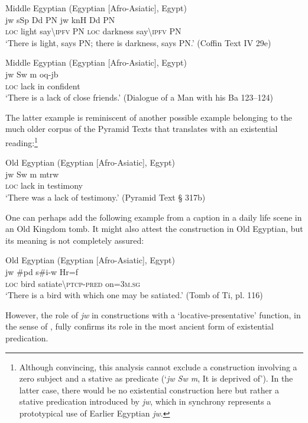 \documentclass[output=paper]{langsci/langscibook}
\begin{document}
\ea Middle Egyptian (Egyptian [Afro-Asiatic], Egypt) \label{ex:AE14}\\
	\gll jw 	sSp Dd PN jw knH Dd PN\\
	\textsc{loc} light say\textbackslash\textsc{ipfv} PN \textsc{loc} darkness say\textbackslash\textsc{ipfv} PN\\
	\glt ‘There is light, says PN; there is darkness, says PN.’ (Coffin Text IV 29e)
\z 

\ea Middle Egyptian (Egyptian [Afro-Asiatic], Egypt) \label{ex:AE15}\\
	\gll jw Sw m oq-jb\\
	\textsc{loc} lack in confident\\
	\glt ‘There is a lack of close friends.’ (Dialogue of a Man with his Ba 123–124)
\z 

The latter example is reminiscent of another possible example belonging to the much older corpus of the Pyramid Texts that \citet[333]{Allen2017} translates with an existential reading:\footnote{Although convincing, this analysis cannot exclude a construction involving a zero subject and a stative as predicate (‘\textit{jw Sw m}, It is deprived of’). In the latter case, there would be no existential construction here but rather a stative predication introduced by \textit{jw}, which in synchrony represents a prototypical use of Earlier Egyptian \textit{jw}.}

\ea Old Egyptian (Egyptian [Afro-Asiatic], Egypt) \label{ex:AE16}\\
	\gll jw 	Sw m mtrw\\
	\textsc{loc} lack in testimony\\
	\glt ‘There was a lack of testimony.’ (Pyramid Text § 317b)
\z 

One can perhaps add the following example from a caption in a daily life scene in an Old Kingdom tomb. It might also attest the construction in Old Egyptian, but its meaning is not completely assured:

\ea Old Egyptian (Egyptian [Afro-Asiatic], Egypt) \label{ex:AE17}\\
	\gll jw 	\#pd s\#i-w Hr=f\\ 
	\textsc{loc} bird satiate\textbackslash\textsc{ptcp-pred} on=\textsc{3m.sg}\\
	\glt ‘There is a bird with which one may be satiated.’ (Tomb of Ti, pl. 116)
\z 

However, the role of \textit{jw} in constructions with a ‘locative-presentative’ function, in the sense of \cite{hengeveld1992}, fully confirms its role in the most ancient form of existential predication.
\end{document}
